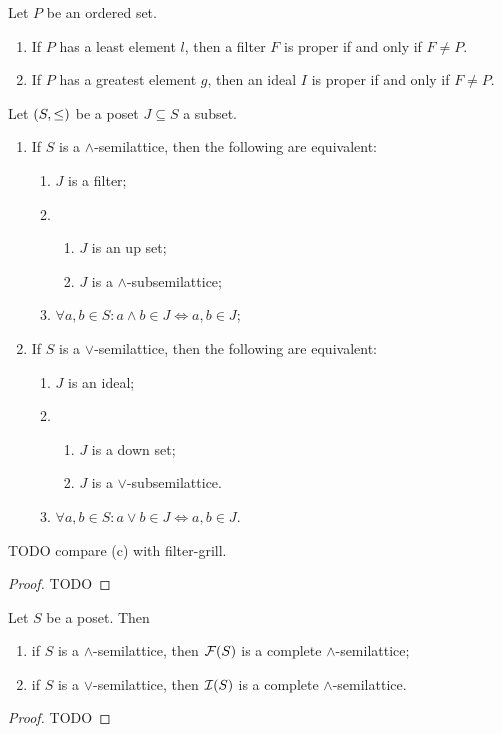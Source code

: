 \begin{lemma}
Let $P$ be an ordered set.
\begin{enumerate}
\item If $P$ has a least element $l$, then a filter $F$ is proper \textup{if and only if} $F\neq P$.
\item If $P$ has a greatest element $g$, then an ideal $I$ is proper \textup{if and only if} $F\neq P$.
\end{enumerate}
\end{lemma}


\begin{lemma}
Let $\sSet{S,\leq}$ be a poset $J\subseteq S$ a subset.
\begin{enumerate}
\item If $S$ is a $\wedge$-semilattice, then the following are equivalent:
\begin{enumerate}
\item $J$ is a filter;
\item \begin{enumerate}
\item $J$ is an up set;
\item $J$ is a $\wedge$-subsemilattice;
\end{enumerate}
\item $\forall a,b\in S: a\wedge b\in J \iff a,b\in J$;
\end{enumerate}
\item If $S$ is a $\vee$-semilattice, then the following are equivalent:
\begin{enumerate}
\item $J$ is an ideal;
\item \begin{enumerate}
\item $J$ is a down set;
\item $J$ is a $\vee$-subsemilattice.
\end{enumerate}
\item $\forall a,b\in S: a\vee b\in J \iff a,b\in J$.
\end{enumerate}
\end{enumerate}
TODO compare (c) with filter-grill.
\end{lemma}
\begin{proof}
TODO
\end{proof}
\begin{corollary} \label{filterSetIdealSetWedgeSemilattice}
Let $S$ be a poset. Then
\begin{enumerate}
\item if $S$ is a $\wedge$-semilattice, then $\operatorname{\mathcal{F}}(S)$ is a complete $\wedge$-semilattice;
\item if $S$ is a $\vee$-semilattice, then $\operatorname{\mathcal{I}}(S)$ is a complete $\wedge$-semilattice.
\end{enumerate}
\end{corollary}
\begin{proof}
TODO
\end{proof}

